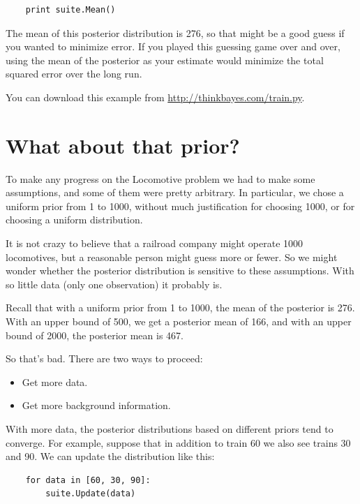 \documentclass[12pt]{book}
\begin{document}
\begin{verbatim}
    print suite.Mean()
\end{verbatim}

The mean of this posterior distribution is 276, so that might be a
good guess if you wanted to minimize error.  If you played this
guessing game over and over, using the mean of the posterior as your
estimate would minimize the total squared error over the long run.

You can download this example from \url{http://thinkbayes.com/train.py}.


\section{What about that prior?}

To make any progress on the Locomotive problem we had to make
some assumptions, and some of them were pretty arbitrary.  In
particular, we chose a uniform prior from 1 to 1000, without
much justification for choosing 1000, or for choosing a uniform
distribution.

It is not crazy to believe that a railroad company might operate
1000 locomotives, but a reasonable person might guess more or fewer.
So we might wonder whether the posterior distribution is sensitive
to these assumptions.  With so little data (only one observation)
it probably is.

Recall that with a uniform prior from 1 to 1000, the mean of
the posterior is 276.  With an upper bound of 500, we get a
posterior mean of 166, and with an upper bound of 2000,
the posterior mean is 467.

So that's bad.  There are two ways to proceed:

\begin{itemize}

\item Get more data.

\item Get more background information.

\end{itemize}

With more data, the posterior distributions based on different
priors tend to converge.  For example, suppose that in addition
to train 60 we also see trains 30 and 90.  We can update the
distribution like this:

\begin{verbatim}
    for data in [60, 30, 90]:
        suite.Update(data)
\end{verbatim}
\end{document}
